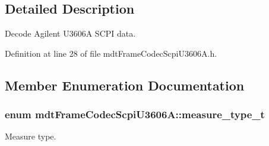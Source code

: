 \subsection{Detailed Description}
Decode Agilent U3606\-A S\-C\-P\-I data. 

Definition at line 28 of file mdt\-Frame\-Codec\-Scpi\-U3606\-A.\-h.



\subsection{Member Enumeration Documentation}
\hypertarget{classmdt_frame_codec_scpi_u3606_a_a3d7a1de14d77797a08e3d2991fa9f004}{
\subsubsection[{measure\-\_\-type\-\_\-t}]{\setlength{\rightskip}{0pt plus 5cm}enum {\bf mdt\-Frame\-Codec\-Scpi\-U3606\-A\-::measure\-\_\-type\-\_\-t}}}\label{classmdt_frame_codec_scpi_u3606_a_a3d7a1de14d77797a08e3d2991fa9f004}


Measure type. 

